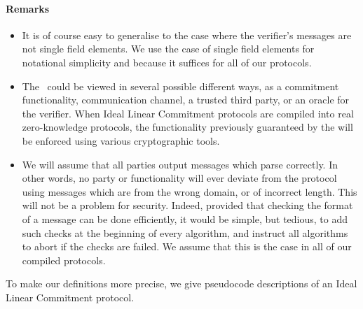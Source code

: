 \paragraph{Remarks}
\begin{itemize}
\item It is of course easy to generalise to the case where the verifier's messages are not single field elements. We use the case of single field elements for notational simplicity and because it suffices for all of our protocols.
\item The \ILC\ could be viewed in several possible different ways, as a commitment functionality, communication channel, a trusted third party, or an oracle for the verifier. When Ideal Linear Commitment protocols are compiled into real zero-knowledge protocols, the functionality previously guaranteed by the \ILC will be enforced using various cryptographic tools.
\item We will assume that all parties output messages which parse correctly. In other words, no party or functionality will ever deviate from the protocol using messages which are from the wrong domain, or of incorrect length. This will not be a problem for security. Indeed, provided that checking the format of a message can be done efficiently, it would be simple, but tedious, to add such checks at the beginning of every algorithm, and instruct all algorithms to abort if the checks are failed. We assume that this is the case in all of our compiled protocols. 
\end{itemize}

To make our definitions more precise, we give pseudocode descriptions of an Ideal Linear Commitment protocol.

